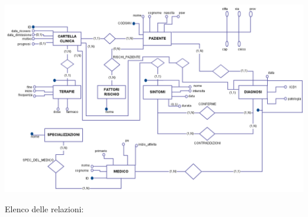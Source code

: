 \documentclass[a4paper,titlepage]{article}
\begin{document}
\vfill
 \begin{center}
	
\centerline{
 \includegraphics[scale=0.45]{ER.png}
}
 \end{center}
\vfill
\newpage
{\large Elenco delle relazioni:}\newline
\end{document}
